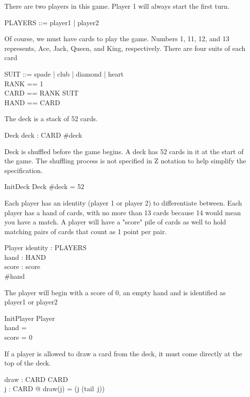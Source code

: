 \documentclass{article}
\begin{document}
There are two players in this game. Player 1 will always start the first turn.
\begin{zed} 
    PLAYERS ::= player1 | player2
\end{zed}

Of course, we must have cards to play the game.
Numbers 1, 11, 12, and 13 represents, Ace, Jack, Queen, and King, respectively.
There are four suits of each card
\begin{zed}
    SUIT ::= spade | club | diamond | heart \\
    RANK == 1 \\
    CARD == RANK \cross SUIT \\
    HAND == \power CARD
\end{zed}
\clearpage
The deck is a stack of 52 cards. 
\begin{schema}{Deck}
    deck : \power CARD
    \where
    \#deck 
\end{schema}

Deck is shuffled before the game begins. A deck has 52 cards in it at the
start of the game. The shuffling process is not specified in Z notation
to help simplify the specification.
\begin{schema}{InitDeck}
    Deck
    \where
    \#deck = 52
\end{schema}

Each player has an identity (player 1 or player 2) to
differentiate between. Each player has a hand of cards, with
no more than 13 cards because 14 would mean you have a match.
A player will have a "score" pile of cards as well to hold
matching pairs of cards that count as 1 point per pair.

\begin{schema}{Player}
    identity : PLAYERS \\
    hand : HAND \\
    score : \nat
    \where
    score  \\
    \#hand 
\end{schema}

The player will begin with a score of 0, an empty hand
and is identified as player1 or player2
\begin{schema}{InitPlayer}
    Player\\
    \where
    hand = \emptyset \\
    score = 0
\end{schema}

If a player is allowed to draw a card from the deck, it must come
directly at the top of the deck.
\begin{axdef}
    draw : \power CARD \fun \power CARD\\
    \where
    \forall j : \power CARD @ draw(j) = (j \setminus (tail~j))
\end{axdef}
\end{document}

